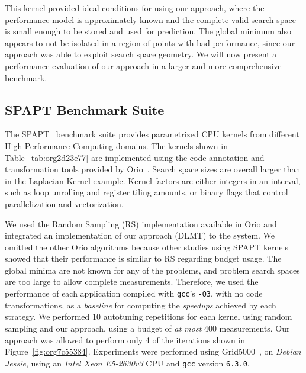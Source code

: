 \documentclass[conference]{IEEEtran}
\begin{document}
This kernel provided ideal conditions for using our approach, where the
performance model is approximately known and the complete valid search space is
small enough to be stored and used for prediction. The global minimum also
appears to not be isolated in a region of points with bad performance, since our
approach was able to exploit search space geometry. We will now present a
performance evaluation of our approach in a larger and more comprehensive
benchmark.
\subsection{SPAPT Benchmark Suite}
\label{sec:org33afa5b}
The SPAPT~\cite{balaprakash2012spapt} benchmark suite provides
parametrized CPU kernels from different High Performance Computing domains. The
kernels shown in Table~\ref{tab:org2d23e77} are implemented using the code
annotation and transformation tools provided by
Orio~\cite{hartono2009annotation}. Search space sizes are overall larger
than in the Laplacian Kernel example. Kernel factors are either integers in an
interval, such as loop unrolling and register tiling amounts, or binary flags
that control parallelization and vectorization.

We used the Random Sampling (RS) implementation available in Orio and integrated
an implementation of our approach (DLMT) to the system. We omitted the other
Orio algorithms because other studies using SPAPT
kernels~\cite{balaprakash2011can,balaprakash2012experimental} showed that
their performance is similar to RS regarding budget usage. The global minima are
not known for any of the problems, and problem search spaces are too large to
allow complete measurements. Therefore, we used the performance of each
application compiled with \texttt{gcc}'s \texttt{-O3}, with no code
transformations, as a \emph{baseline} for computing the \emph{speedups} achieved by each
strategy. We performed 10 autotuning repetitions for each kernel using random
sampling and our approach, using a budget of \emph{at most} 400 measurements. Our
approach was allowed to perform only 4 of the iterations shown in
Figure~\ref{fig:org7c55384}. Experiments were performed using
Grid5000~\cite{balouek2013adding}, on \emph{Debian Jessie}, using an \emph{Intel
Xeon E5-2630v3} CPU and \texttt{gcc} version \texttt{6.3.0}.
\end{document}
